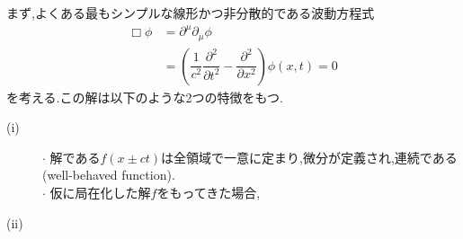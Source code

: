 \documentclass[dvipdfmx,11pt,a4paper]{jsbook}
\begin{document}
まず,よくある最もシンプルな線形かつ非分散的である波動方程式
\begin{align}
    \Box\phi & =\partial^{\mu}\partial_{\mu}\phi\nonumber                                                               \\
             & =\left(\dfrac{1}{c^2}\dfrac{\partial^2}{\partial t^2}-\dfrac{\partial^2}{\partial x^2}\right)\phi(x,t)=0
\end{align}
を考える.この解は以下のような2つの特徴をもつ.
\begin{description}
    \item[(i)] $\cdot$ 解である$f(x\pm ct)$は全領域で一意に定まり,微分が定義され,連続である(well-behaved function).\\
          $\cdot$ 仮に局在化した解$f$をもってきた場合,
    \item[(ii)]
\end{description}
\end{document}
